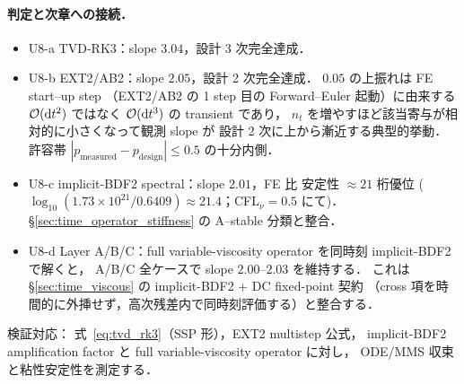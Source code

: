 \paragraph{判定と次章への接続．}
\begin{itemize}\setlength{\itemsep}{0pt}
  \item U8-a TVD-RK3：slope $3.04$，設計 3 次完全達成．\checkmark
  \item U8-b EXT2/AB2：slope $2.05$，設計 2 次完全達成．\checkmark
        $0.05$ の上振れは FE start--up step
        （EXT2/AB2 の 1 step 目の Forward--Euler 起動）に由来する $\mathcal{O}(\mathrm{d}t^2)$
        ではなく $\mathcal{O}(\mathrm{d}t^3)$ の transient であり，
        $n_t$ を増やすほど該当寄与が相対的に小さくなって観測 slope が
        設計 2 次に上から漸近する典型的挙動．許容帯
        $|p_{\mathrm{measured}} - p_{\mathrm{design}}| \le 0.5$ の十分内側．
  \item U8-c implicit-BDF2 spectral：slope $2.01$，FE 比 安定性 $\approx 21$ 桁優位
        ($\log_{10}(1.73\!\times\!10^{21}/0.6409) \approx 21.4$；CFL$_\nu=0.5$ にて)．
        §\ref{sec:time_operator_stiffness} の A--stable 分類と整合．\checkmark
  \item U8-d Layer A/B/C：full variable-viscosity operator を同時刻 implicit-BDF2 で解くと，
        A/B/C 全ケースで slope $2.00$--$2.03$ を維持する．
        これは §\ref{sec:time_viscous} の implicit-BDF2 + DC fixed-point 契約
        （cross 項を時間的に外挿せず，高次残差内で同時刻評価する）と整合する．\checkmark
\end{itemize}
検証対応：
式~\eqref{eq:tvd_rk3}（SSP 形），EXT2 multistep 公式，
implicit-BDF2 amplification factor と full variable-viscosity operator に対し，
ODE/MMS 収束と粘性安定性を測定する．

\FloatBarrier
